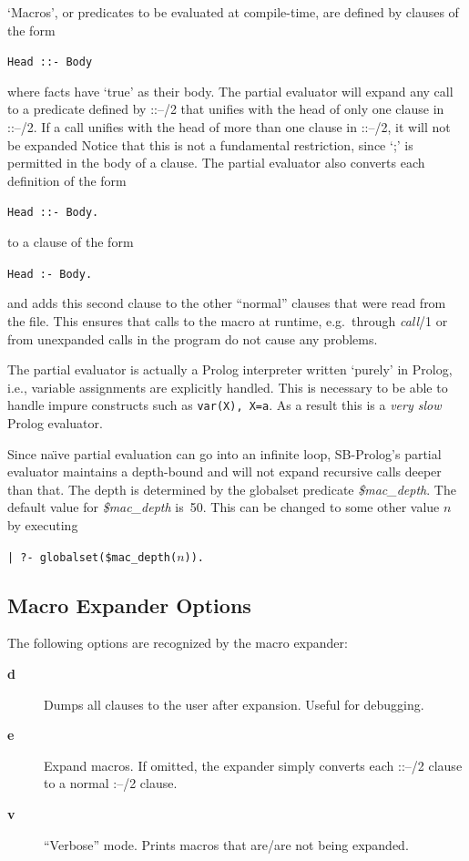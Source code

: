 `Macros', or predicates to be evaluated at compile-time, are defined
by clauses of the form
\begin{center}
{\tt Head ::- Body}
\end{center}
where facts have `true' as their body.
The partial evaluator will expand any call to a predicate defined by ::--/2 that
unifies with the head of only one clause in ::--/2.
If a call unifies with the head of more than one clause in ::--/2,
it will not be expanded
Notice that this is not a fundamental restriction, since `;' is permitted
in the body of a clause.
The partial evaluator also converts each definition of the form
\begin{center}
{\tt Head ::- Body.}
\end{center}
to a clause of the form
\begin{center}
{\tt Head :- Body.}
\end{center}
and adds this second clause to the other ``normal'' clauses that were read from
the file.
This ensures that calls to the macro at runtime,
e.g.\ through {\em call}/1 or from unexpanded calls in the program
do not cause any problems.

The partial evaluator is actually a Prolog interpreter written
`purely' in Prolog, i.e., variable assignments are explicitly handled.
This is necessary to be able to handle impure constructs such as
{\tt var(X),~X=a}.
As a result this is a {\em very slow} Prolog evaluator.

Since na\"{\i}ve partial evaluation can go into an infinite loop,
SB-Prolog's partial evaluator
maintains a depth-bound and will not expand recursive calls deeper than that.
The depth is determined by the globalset predicate {\em \$mac\_depth}.
The default value for {\em \$mac\_depth} is~50.
This can be changed to some other value $n$ by executing
\begin{center}
{\tt | ?- globalset(\$mac\_depth($n$)).}
\end{center}

\subsection{Macro Expander Options}

The following options are recognized by the macro expander:
\begin{description}
\item[{\bf d}] Dumps all clauses to the user after expansion.
    Useful for debugging.
\item[{\bf e}] Expand macros.
    If omitted, the expander simply converts each ::--/2 clause
    to a normal :--/2 clause.
\item[{\bf v}] ``Verbose'' mode.
    Prints macros that are/are not being expanded.
\end{description}

